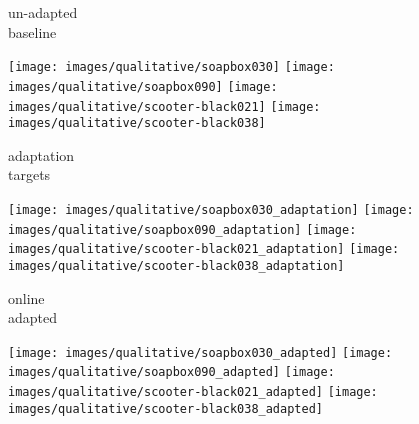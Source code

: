 \documentclass{bmvc2k}
\begin{document}
\begin{figure}[t]
\begin{center}

\newcommand{\myscale}{0.08}

\begin{minipage}{0.12\textwidth}
\begin{center}
\vfill
\small
un-adapted\\
baseline
\vfill
\end{center}
\end{minipage}
\begin{minipage}{0.87\textwidth}
\texttt{[image: images/qualitative/soapbox030]}
\texttt{[image: images/qualitative/soapbox090]}
\hspace{0.1cm}
\texttt{[image: images/qualitative/scooter-black021]}
\texttt{[image: images/qualitative/scooter-black038]}
\end{minipage}

\begin{minipage}{0.12\textwidth}
\begin{center}
\vfill
\small
adaptation\\
targets
\vfill
\end{center}
\end{minipage}
\begin{minipage}{0.87\textwidth}
\texttt{[image: images/qualitative/soapbox030\_adaptation]}
\texttt{[image: images/qualitative/soapbox090\_adaptation]}
\hspace{0.1cm}
\texttt{[image: images/qualitative/scooter-black021\_adaptation]}
\texttt{[image: images/qualitative/scooter-black038\_adaptation]}
\end{minipage}

\begin{minipage}{0.12\textwidth}
\begin{center}
\vfill
\small
online\\
adapted
\vfill
\end{center}
\end{minipage}
\begin{minipage}{0.87\textwidth}
\texttt{[image: images/qualitative/soapbox030\_adapted]}
\texttt{[image: images/qualitative/soapbox090\_adapted]}
\hspace{0.1cm}
\texttt{[image: images/qualitative/scooter-black021\_adapted]}
\texttt{[image: images/qualitative/scooter-black038\_adapted]}
\end{minipage}


\end{center}
\end{figure}
\end{document}
